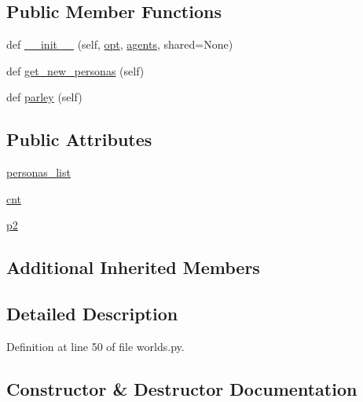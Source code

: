 \subsection*{Public Member Functions}
\begin{DoxyCompactItemize}
\item 
def \hyperlink{classparlai_1_1tasks_1_1convai2_1_1worlds_1_1InteractiveWorld_a5fb521abcaeae7438ab08feff1bdfccf}{\+\_\+\+\_\+init\+\_\+\+\_\+} (self, \hyperlink{classparlai_1_1core_1_1worlds_1_1World_a3640d92718acd3e6942a28c1ab3678bd}{opt}, \hyperlink{classparlai_1_1core_1_1worlds_1_1DialogPartnerWorld_a04185d1d55ca86c96c796f12f2226fc9}{agents}, shared=None)
\item 
def \hyperlink{classparlai_1_1tasks_1_1convai2_1_1worlds_1_1InteractiveWorld_acac91ca0d5cfc546437874e2f6d801a3}{get\+\_\+new\+\_\+personas} (self)
\item 
def \hyperlink{classparlai_1_1tasks_1_1convai2_1_1worlds_1_1InteractiveWorld_a75559c133b900cdd71389c9760e9a703}{parley} (self)
\end{DoxyCompactItemize}
\subsection*{Public Attributes}
\begin{DoxyCompactItemize}
\item 
\hyperlink{classparlai_1_1tasks_1_1convai2_1_1worlds_1_1InteractiveWorld_a544124310a84b4fb70abda3b41df5323}{personas\+\_\+list}
\item 
\hyperlink{classparlai_1_1tasks_1_1convai2_1_1worlds_1_1InteractiveWorld_a3caeecc4c52e4dce168341bbb1519b03}{cnt}
\item 
\hyperlink{classparlai_1_1tasks_1_1convai2_1_1worlds_1_1InteractiveWorld_a8f91a884b0bcb293335e3b7cb6404a1f}{p2}
\end{DoxyCompactItemize}
\subsection*{Additional Inherited Members}


\subsection{Detailed Description}


Definition at line 50 of file worlds.\+py.



\subsection{Constructor \& Destructor Documentation}
\mbox{\label{classparlai_1_1tasks_1_1convai2_1_1worlds_1_1InteractiveWorld_a5fb521abcaeae7438ab08feff1bdfccf}} 

